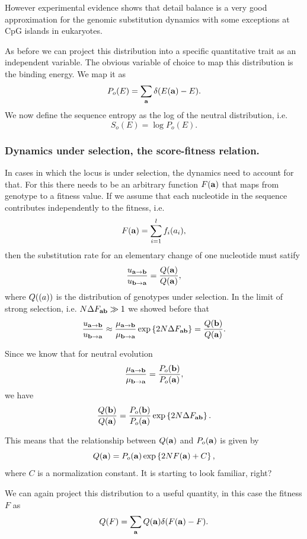 However experimental evidence shows that detail balance is a very good
approximation for the genomic substitution dynamics with some exceptions at CpG
islands in eukaryotes.

As before we can project this distribution into a specific quantitative trait as
an independent variable. The obvious variable of choice to map this distribution
is the binding energy. We map it as
\begin{equation}
  P_o(E) = \sum_{\mathbf{a}} \delta (E(\mathbf{a}) - E).
\end{equation}
We now define the sequence entropy as the log of the neutral distribution, i.e.
\begin{equation}
  S_o(E) = \log P_o (E).
\end{equation}

\subsubsection{Dynamics under selection, the score-fitness relation.}

In cases in which the locus is under selection, the dynamics need to account for
that. For this there needs to be an arbitrary function $F(\mathbf{a})$ that maps
from genotype to a fitness value. If we assume that each nucleotide in the
sequence contributes independently to the fitness, i.e.
\begin{equation}
  F(\mathbf{a}) = \sum_{i = 1}^l f_i (a_i),
\end{equation}
then the substitution rate for an elementary change of one nucleotide must
satify
\begin{equation}
  {u_{\mathbf{a} \rightarrow \mathbf{b}}\over u_{\mathbf{b} \rightarrow \mathbf{a}}} = {Q (\mathbf{a}) \over Q(\mathbf{a})},
\end{equation}
where $Q(\mathbf{(}a))$ is the distribution of genotypes under selection. In the
limit of strong selection, i.e. $N \Delta F_{\mathbf{ab}} \gg 1$ we showed before that
\begin{equation}
  {u_{\mathbf{a} \rightarrow \mathbf{b}}\over u_{\mathbf{b} \rightarrow \mathbf{a}}} \approx {\mu_{\mathbf{a} \rightarrow \mathbf{b}}\over \mu_{\mathbf{b} \rightarrow \mathbf{a}}}
  \exp \left\{ 2 N \Delta F_{\mathbf{ab}} \right\} = {Q(\mathbf{b}) \over Q(\mathbf{a})}.
\end{equation}

Since we know that for neutral evolution
\begin{equation}
  {\mu_{\mathbf{a} \rightarrow \mathbf{b}}\over \mu_{\mathbf{b} \rightarrow \mathbf{a}}} = {P_o(\mathbf{b}) \over P_o(\mathbf{a})},
\end{equation}
we have
\begin{equation}
  {Q(\mathbf{b}) \over Q(\mathbf{a})} = {P_o(\mathbf{b}) \over P_o(\mathbf{a})}
  \exp \left\{ 2 N \Delta F_{\mathbf{ab}} \right\}.
\end{equation}

This means that the relationship between $Q(\mathbf{a})$ and $P_o(\mathbf{a})$ is given
by
\begin{equation}
  Q(\mathbf{a}) = P_o(\mathbf{a}) \exp \left\{ 2 N F(\mathbf{a}) + C \right\},
\end{equation}
where $C$ is a normalization constant. It is starting to look familiar, right?

We can again project this distribution to a useful quantity, in this case the
fitness $F$ as
\begin{equation}
  Q(F) = \sum_{\mathbf{a}} Q(\mathbf{a}) \delta (F(\mathbf{a}) - F).
\end{equation}
